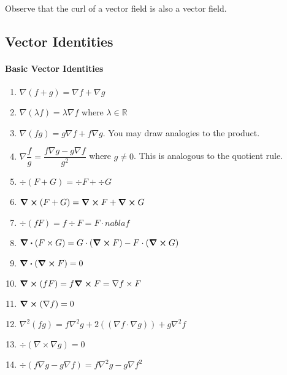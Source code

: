Observe that the curl of a vector field is also a vector field.

\subsection{Vector Identities}


\paragraph{Basic Vector Identities}

\begin{enumerate}
    \item \(\nabla(f + g) = \nabla f + \nabla g\)
    \item \(\nabla (\lambda f) = \lambda \nabla f\) where \(\lambda \in \mathbb{R}\)
    \item \(\nabla (fg) = g \nabla f + f \nabla g\). You may draw analogies to the product.
    \item \(\nabla \dfrac{f}{g} = \dfrac{f\nabla g - g\nabla f}{g^2}\) where \(g\neq 0\). This is analogous to the quotient rule.
    \item \(\div (F + G) = \div F + \div G\)
    \item \(\curl (F + G) = \curl F + \curl G\)
    \item \(\div (fF) = f\div F = F\cdot nabla f\)
    \item \(\div (F\times G) = G \cdot (\curl F) - F \cdot (\curl G)\)
    \item \(\div(\curl F) = 0\)
    \item \(\curl (fF) = f\curl F = \nabla f \times F\)
    \item  \(\curl (\nabla f) = 0\)
    \item \(\nabla^2 (fg) = f\nabla^2 g + 2((\nabla f \cdot \nabla g)) + g\nabla^2f\)
    \item \(\div (\nabla \times \nabla g) = 0\)
    \item \(\div(f\nabla g - g\nabla f) = f\nabla^2 g - g\nabla f^2\)
\end{enumerate}
